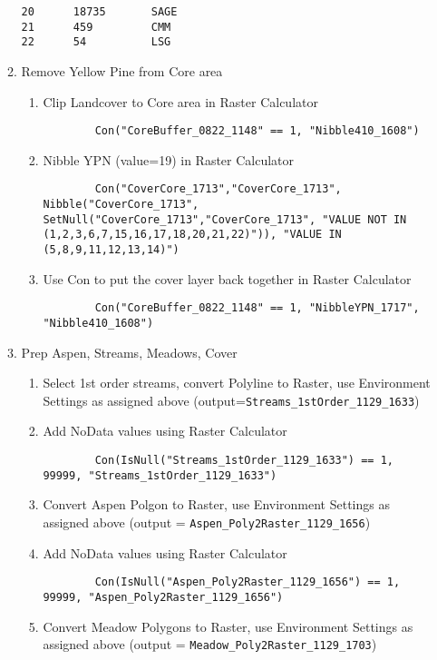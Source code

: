 \begin{enumerate}
\begin{enumerate}
\begin{verbatim}
20      18735       SAGE
21      459         CMM
22      54          LSG
    \end{verbatim}
    \item Remove Yellow Pine from Core area
        \begin{enumerate}
        \item Clip Landcover to Core area in Raster Calculator 
        \begin{lstlisting}
        Con("CoreBuffer_0822_1148" == 1, "Nibble410_1608") 
        \end{lstlisting}
        \item Nibble YPN (value=19) in Raster Calculator \begin{lstlisting}
        Con("CoverCore_1713","CoverCore_1713", Nibble("CoverCore_1713", SetNull("CoverCore_1713","CoverCore_1713", "VALUE NOT IN (1,2,3,6,7,15,16,17,18,20,21,22)")), "VALUE IN (5,8,9,11,12,13,14)") \end{lstlisting}
        \item Use Con to put the cover layer back together in Raster Calculator \begin{lstlisting}
        Con("CoreBuffer_0822_1148" == 1, "NibbleYPN_1717", "Nibble410_1608")\end{lstlisting}
        \end{enumerate}
    \item Prep Aspen, Streams, Meadows, Cover
        \begin{enumerate}
        \item Select 1st order streams, convert Polyline to Raster, use Environment Settings as assigned above (output=\lstinline{Streams_1stOrder_1129_1633})
        \item Add NoData values using Raster Calculator \begin{lstlisting}
        Con(IsNull("Streams_1stOrder_1129_1633") == 1, 99999, "Streams_1stOrder_1129_1633") \end{lstlisting}
        \item Convert Aspen Polgon to Raster, use Environment Settings as assigned above (output = \lstinline{Aspen_Poly2Raster_1129_1656})
        \item Add NoData values using Raster Calculator \begin{lstlisting}
        Con(IsNull("Aspen_Poly2Raster_1129_1656") == 1, 99999, "Aspen_Poly2Raster_1129_1656") \end{lstlisting}
        \item Convert Meadow Polygons to Raster, use Environment Settings as assigned above (output = \lstinline{Meadow_Poly2Raster_1129_1703})

\end{enumerate}
\end{enumerate}
\end{enumerate}

